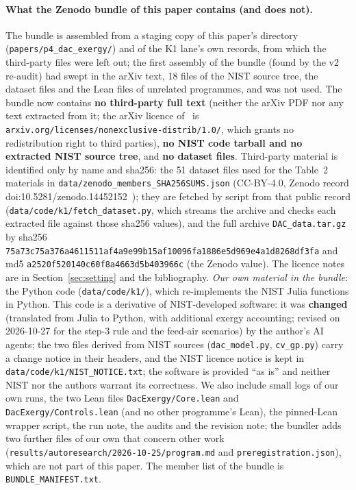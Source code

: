 \documentclass[10pt]{article}
\begin{document}
\paragraph{What the Zenodo bundle of this paper contains (and does not).} The bundle is assembled from a staging copy of this paper's directory (\texttt{papers/p4\_dac\_exergy/}) and of the K1 lane's own records, from which the third-party files were left out; the first assembly of the bundle (found by the v2 re-audit) had swept in the arXiv text, 18 files of the NIST source tree, the dataset files and the Lean files of unrelated programmes, and was not used. The bundle now contains \textbf{no third-party full text} (neither the arXiv PDF nor any text extracted from it; the arXiv licence of~\cite{mcd} is \texttt{arxiv.org/licenses/nonexclusive-distrib/1.0/}, which grants no redistribution right to third parties), \textbf{no NIST code tarball and no extracted NIST source tree}, and \textbf{no dataset files}. Third-party material is identified only by name and sha256: the 51 dataset files used for the Table~2 materials in \texttt{data/zenodo\_members\_SHA256SUMS.json} (CC-BY-4.0, Zenodo record doi:10.5281/zenodo.14452152~\cite{zen}); they are fetched by script from that public record (\texttt{data/code/k1/fetch\_dataset.py}, which streams the archive and checks each extracted file against those sha256 values), and the full archive \texttt{DAC\_data.tar.gz} by sha256 \texttt{75a73c75a376a4611511af4a9e99b15af10096fa1886e5d969e4a1d8268df3fa} and md5 \texttt{a2520f520140c60f8a4663d5b403966c} (the Zenodo value). The licence notes are in Section~\ref{sec:setting} and the bibliography.
\emph{Our own material in the bundle}: the Python code (\texttt{data/code/k1/}), which re-implements the NIST Julia functions in Python. This code is a derivative of NIST-developed software: it was \textbf{changed} (translated from Julia to Python, with additional exergy accounting; revised on 2026-10-27 for the step-3 rule and the feed-air scenarios) by the author's AI agents; the two files derived from NIST sources (\texttt{dac\_model.py}, \texttt{cv\_gp.py}) carry a change notice in their headers, and the NIST licence notice is kept in \texttt{data/code/k1/NIST\_NOTICE.txt}; the software is provided ``as is'' and neither NIST nor the authors warrant its correctness. We also include small logs of our own runs, the two Lean files \texttt{DacExergy/Core.lean} and \texttt{DacExergy/Controls.lean} (and no other programme's Lean), the pinned-Lean wrapper script, the run note, the audits and the revision note; the bundler adds two further files of our own that concern other work (\texttt{results/autoresearch/2026-10-25/program.md} and \texttt{preregistration.json}), which are not part of this paper. The member list of the bundle is \texttt{BUNDLE\_MANIFEST.txt}.
\end{document}

